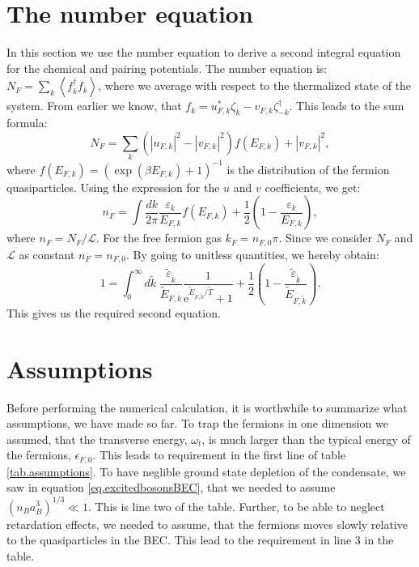 \section{The number equation} \label{sec.chemicalpotential.numberequation}
In this section we use the number equation to derive a second integral equation for the chemical and pairing potentials. The number equation is: $N_F = \sum_k \left \langle f_k^\dagger f_k \right \rangle$, where we average with respect to the thermalized state of the system. From earlier we know, that $f_k = u_{F,k}^* \zeta_k -v_{F,k} \zeta_{-k}^\dagger$. This leads to the sum formula:
\begin{equation}
N_F = \sum_k \left(|u_{F,k}|^2-|v_{F,k}|^2\right) f(E_{F,k}) + |v_{F,k}|^2,\nonumber
\end{equation}
where $f(E_{F,k}) = (\exp(\beta E_{F,k}) + 1)^{-1}$ is the distribution of the fermion quasiparticles. Using the expression for the $u$ and $v$ coefficients, we get:
\begin{equation}
n_F = \int \frac{dk}{2\pi} \frac{\varepsilon_k}{E_{F,k}}f(E_{F,k}) + \frac{1}{2}\left(1 - \frac{\varepsilon_k}{E_{F,k}}\right), \nonumber
\end{equation}
where $n_F = N_F/\mathcal{L}$. For the free fermion gas $k_F = n_{F,0}\pi$. Since we consider $N_F$ and $\mathcal{L}$ as constant $n_F = n_{F,0}$. By going to unitless quantities, we hereby obtain:
\begin{equation}
1 = \int_0^\infty d\tilde{k} \; \frac{\tilde{\varepsilon}_{\tilde{k}}}{\tilde{E}_{F,k}}\frac{1}{\text{e}^{ \tilde{E}_{F,\tilde{k}}/\tilde{T} } + 1 } + \frac{1}{2}\left(1 - \frac{\tilde{\varepsilon}_{\tilde{k}}}{\tilde{E}_{F,\tilde{k}}}\right). 
\label{eq.NumberEquationUnitless}
\end{equation}
This gives us the required second equation.

\section{Assumptions}
Before performing the numerical calculation, it is worthwhile to summarize what assumptions, we have made so far. To trap the fermions in one dimension we assumed, that the transverse energy, $\omega_t$, is much larger than the typical energy of the fermions, $\epsilon_{F,0}$. This leads to requirement in the first line of table \ref{tab.assumptions}. To have neglible ground state depletion of the condensate, we saw in equation \eqref{eq.excitedbosonsBEC}, that we needed to assume $(n_Ba_B^3)^{1/3}\ll 1$. This is line two of the table. Further, to be able to neglect retardation effects, we needed to assume, that the fermions moves slowly relative to the quasiparticles in the BEC. This lead to the requirement in line 3 in the table.


